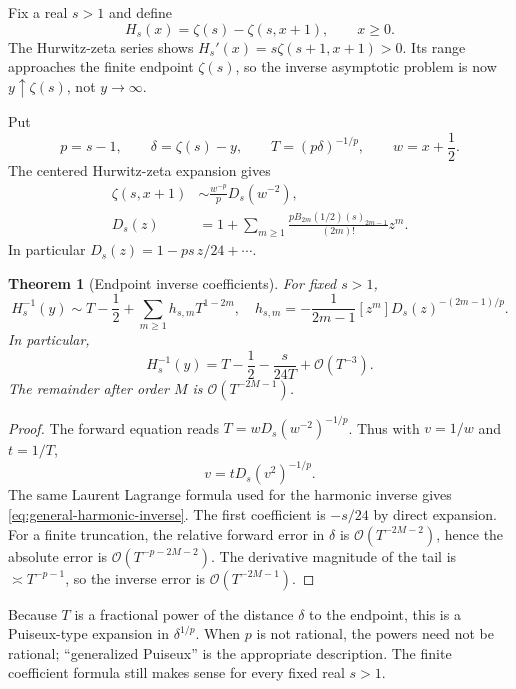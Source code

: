\documentclass[11pt,a4paper]{article}
\numberwithin{equation}{section}
\newtheorem{theorem}{Theorem}[section]
\theoremstyle{definition}
\theoremstyle{remark}
\newcommand{\bigO}{\mathcal O}
\newcommand{\rising}[2]{(#1)_{#2}}
\begin{document}
Fix a real $s>1$ and define
\begin{equation}
 H_s(x)=\zeta(s)-\zeta(s,x+1),\qquad x\ge0.
 \label{eq:general-harmonic}
\end{equation}
The Hurwitz-zeta series shows
$H_s'(x)=s\zeta(s+1,x+1)>0$. Its range approaches the finite endpoint $\zeta(s)$, so the inverse asymptotic problem is now $y\uparrow\zeta(s)$, not $y\to\infty$.

Put
\begin{equation}
 p=s-1,\qquad \delta=\zeta(s)-y,\qquad
 T=(p\delta)^{-1/p},\qquad w=x+\frac12.
 \label{eq:general-harmonic-core}
\end{equation}
The centered Hurwitz-zeta expansion \cite{dlmfhurwitz} gives
\begin{align}
 \zeta(s,x+1)&\sim\frac{w^{-p}}pD_s(w^{-2}),\nonumber\\
 D_s(z)&=1+\sum_{m\ge1}
  \frac{pB_{2m}(1/2)\rising{s}{2m-1}}{(2m)!}z^m.
 \label{eq:general-harmonic-D}
\end{align}
In particular $D_s(z)=1-ps\,z/24+\cdots$.

\begin{theorem}[Endpoint inverse coefficients]
\label{thm:general-harmonic-inverse}
For fixed $s>1$,
\begin{equation}
 H_s^{-1}(y)\sim T-\frac12+\sum_{m\ge1}h_{s,m}T^{1-2m},
 \quad
 h_{s,m}=-\frac1{2m-1}[z^m]
                    D_s(z)^{-(2m-1)/p}.
 \label{eq:general-harmonic-inverse}
\end{equation}
In particular,
\begin{equation}
 H_s^{-1}(y)=T-\frac12-\frac{s}{24T}+\bigO(T^{-3}).
 \label{eq:general-harmonic-first}
\end{equation}
The remainder after order $M$ is $\bigO(T^{-2M-1})$.
\end{theorem}
\begin{proof}
The forward equation reads $T=wD_s(w^{-2})^{-1/p}$. Thus with $v=1/w$ and $t=1/T$,
\[
 v=tD_s(v^2)^{-1/p}.
\]
The same Laurent Lagrange formula used for the harmonic inverse gives \eqref{eq:general-harmonic-inverse}. The first coefficient is $-s/24$ by direct expansion. For a finite truncation, the relative forward error in $\delta$ is $\bigO(T^{-2M-2})$, hence the absolute error is $\bigO(T^{-p-2M-2})$. The derivative magnitude of the tail is $\asymp T^{-p-1}$, so the inverse error is $\bigO(T^{-2M-1})$.
\end{proof}

Because $T$ is a fractional power of the distance $\delta$ to the endpoint, this is a Puiseux-type expansion in $\delta^{1/p}$. When $p$ is not rational, the powers need not be rational; ``generalized Puiseux'' is the appropriate description. The finite coefficient formula still makes sense for every fixed real $s>1$.
\end{document}
